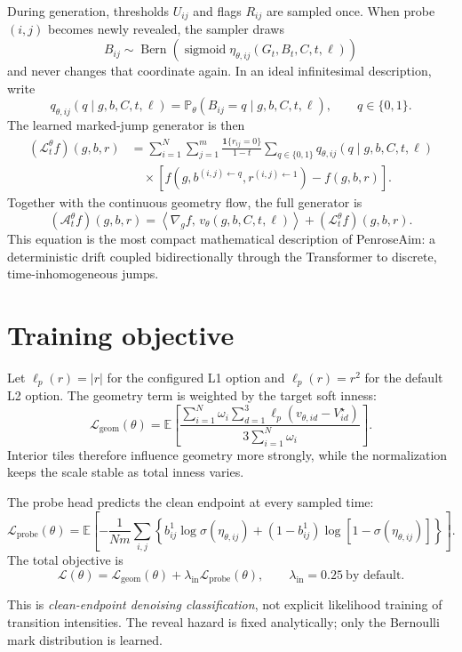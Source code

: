 \documentclass[11pt]{article}
\newcommand{\E}{\mathbb{E}}
\newcommand{\Pp}{\mathbb{P}}
\newcommand{\Ber}{\operatorname{Bern}}
\newcommand{\sigmoid}{\operatorname{sigmoid}}
\newcommand{\1}{\mathbf{1}}
\begin{document}
During generation, thresholds \(U_{ij}\) and flags \(R_{ij}\) are sampled
once.  When probe \((i,j)\) becomes newly revealed, the sampler draws
\[
  B_{ij}\sim
  \Ber\!\left(\sigmoid\eta_{\theta,ij}
  (G_t,B_t,C,t,\ell)\right)
\]
and never changes that coordinate again.  In an ideal infinitesimal
description, write
\[
 q_{\theta,ij}(q\mid g,b,C,t,\ell)
 =\Pp_\theta(B_{ij}=q\mid g,b,C,t,\ell),
 \qquad q\in\{0,1\}.
\]
The learned marked-jump generator is then
\[
\begin{aligned}
(\mathcal L_t^\theta f)(g,b,r)
&=\sum_{i=1}^{N}\sum_{j=1}^{m}
\frac{\1\{r_{ij}=0\}}{1-t}
\sum_{q\in\{0,1\}}q_{\theta,ij}(q\mid g,b,C,t,\ell)\\
&\quad\times
\left[
f\!\left(g,b^{(i,j)\leftarrow q},r^{(i,j)\leftarrow1}\right)
-f(g,b,r)
\right].
\end{aligned}
\]
Together with the continuous geometry flow, the full generator is
\[
  (\mathcal A_t^\theta f)(g,b,r)
  =\left\langle\nabla_g f,\,
    v_\theta(g,b,C,t,\ell)\right\rangle
   +(\mathcal L_t^\theta f)(g,b,r).
\]
This equation is the most compact mathematical description of PenroseAim:
a deterministic drift coupled bidirectionally through the Transformer to
discrete, time-inhomogeneous jumps.

\section{Training objective}

Let \(\ell_p(r)=|r|\) for the configured L1 option and
\(\ell_p(r)=r^2\) for the default L2 option.  The geometry term is weighted by
the target soft inness:
\[
\mathcal L_{\mathrm{geom}}(\theta)
=
\E\!\left[
\frac{
\sum_{i=1}^N\omega_i
\sum_{d=1}^3
\ell_p\!\left(v_{\theta,id}-V^\star_{id}\right)}
{3\sum_{i=1}^N\omega_i}
\right].
\]
Interior tiles therefore influence geometry more strongly, while the
normalization keeps the scale stable as total inness varies.

The probe head predicts the clean endpoint at every sampled time:
\[
\mathcal L_{\mathrm{probe}}(\theta)
=
\E\!\left[
-\frac1{Nm}\sum_{i,j}
\left\{
b^1_{ij}\log\sigma(\eta_{\theta,ij})
+(1-b^1_{ij})\log[1-\sigma(\eta_{\theta,ij})]
\right\}
\right].
\]
The total objective is
\[
  \boxed{\quad
  \mathcal L(\theta)=
  \mathcal L_{\mathrm{geom}}(\theta)
  +\lambda_{\mathrm{in}}\mathcal L_{\mathrm{probe}}(\theta),
  \qquad \lambda_{\mathrm{in}}=0.25\ \text{by default}.
  \quad}
\]

This is \emph{clean-endpoint denoising classification}, not explicit
likelihood training of transition intensities.  The reveal hazard is fixed
analytically; only the Bernoulli mark distribution is learned.
\end{document}
